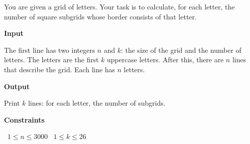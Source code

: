 You are given a grid of letters. Your task is to calculate, for each letter, the number of square subgrids whose border consists of that letter.

\vspace{0.3cm}\noindent\textbf{Input}

The first line has two integers $n$ and $k$: the size of the grid and the number of letters. The letters are the first $k$ uppercase letters.
After this, there are $n$ lines that describe the grid. Each line has $n$ letters.

\vspace{0.3cm}\noindent\textbf{Output}

Print $k$ lines: for each letter, the number of subgrids.

\vspace{0.3cm}\noindent\textbf{Constraints}

\textbullet\ $1 \le n \le 3000$
\textbullet\ $1 \le k \le 26$